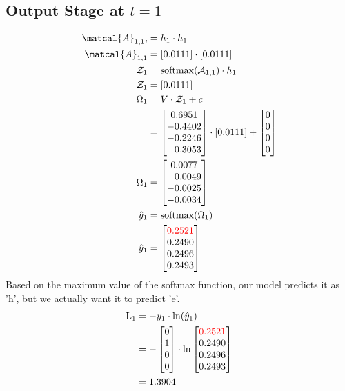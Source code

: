 \documentclass{article}
\begin{document}
\subsection*{Output Stage at $t=1$}
\begin{align*}
\matcal{A}_{1,1},&= h_1 \cdot h_1 \\
\matcal{A}_{1,1} &= [0.0111] \cdot [0.0111] \\
\mathcal{Z}_1 &= \text{softmax}(\mathcal{A}_{1,1}) \cdot h_1 \\
\mathcal{Z}_1 &= [0.0111] \\
\Omega_1 &= V \cdot \mathcal{Z}_1 + c \\
 &= \begin{bmatrix}
  0.6951 \\
 -0.4402 \\
 -0.2246 \\
 -0.3053
\end{bmatrix} \cdot [0.0111] + \begin{bmatrix} 0 \\ 0 \\ 0 \\ 0 \end{bmatrix} \\
\Omega_1 &= \begin{bmatrix}
 0.0077 \\
-0.0049 \\
-0.0025 \\
-0.0034
\end{bmatrix} \\
\hat{y}_1 &= \text{softmax}(\Omega_1) \\
\hat{y}_1 &= \begin{bmatrix}
\textcolor{red}{0.2521} \\
0.2490 \\
0.2496 \\
0.2493
\end{bmatrix}
\end{align*}
Based on the maximum value of the softmax function, our model predicts it as 'h', but we actually want it to predict 'e'.
\begin{align*}
    \text{L}_{1} & = -y_1 \cdot \ln(\hat{y}_1) \\
    &=-\begin{bmatrix} 0 \\ 1 \\ 0 \\ 0 \end{bmatrix} \cdot \ln{\begin{bmatrix}
\textcolor{red}{0.2521} \\
0.2490 \\
0.2496 \\
0.2493
\end{bmatrix}}\\
    &=1.3904
\end{align*}
\end{document}
